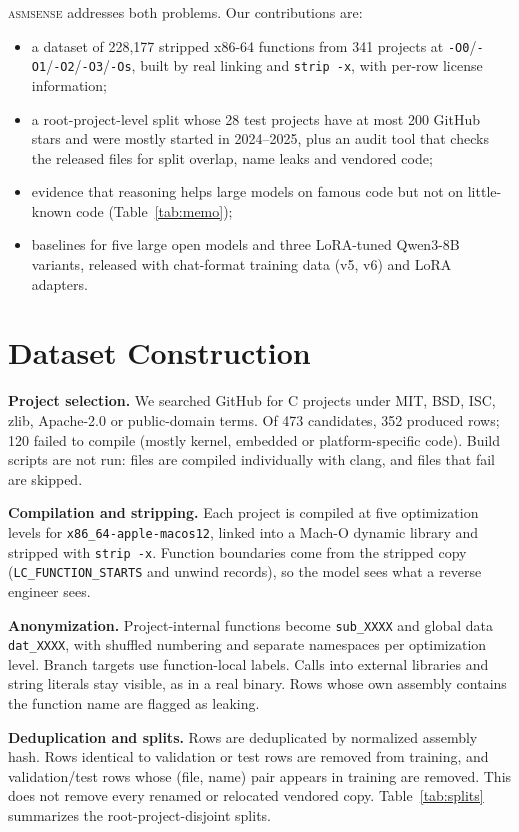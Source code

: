 \documentclass[conference]{IEEEtran}
\newcommand{\tool}{\textsc{asmsense}\xspace}
\begin{document}
\tool addresses both problems. Our contributions are:
\begin{itemize}
  \item a dataset of 228,177 stripped x86-64 functions from 341 projects at \texttt{-O0}/\texttt{-O1}/\texttt{-O2}/\texttt{-O3}/\texttt{-Os}, built by real linking and \texttt{strip -x}, with per-row license information;
  \item a root-project-level split whose 28 test projects have at most 200 GitHub stars and were mostly started in 2024--2025, plus an audit tool that checks the released files for split overlap, name leaks and vendored code;
  \item evidence that reasoning helps large models on famous code but not on little-known code (Table~\ref{tab:memo});
  \item baselines for five large open models and three LoRA-tuned Qwen3-8B variants, released with chat-format training data (v5, v6) and LoRA adapters.
\end{itemize}

\section{Dataset Construction}
\textbf{Project selection.} We searched GitHub for C projects under MIT, BSD, ISC, zlib, Apache-2.0 or public-domain terms. Of 473 candidates, 352 produced rows; 120 failed to compile (mostly kernel, embedded or platform-specific code). Build scripts are not run: files are compiled individually with clang, and files that fail are skipped.

\textbf{Compilation and stripping.} Each project is compiled at five optimization levels for \texttt{x86\_64-apple-macos12}, linked into a Mach-O dynamic library and stripped with \texttt{strip -x}. Function boundaries come from the stripped copy (\texttt{LC\_FUNCTION\_STARTS} and unwind records), so the model sees what a reverse engineer sees.

\textbf{Anonymization.} Project-internal functions become \texttt{sub\_XXXX} and global data \texttt{dat\_XXXX}, with shuffled numbering and separate namespaces per optimization level. Branch targets use function-local labels. Calls into external libraries and string literals stay visible, as in a real binary. Rows whose own assembly contains the function name are flagged as leaking.

\textbf{Deduplication and splits.} Rows are deduplicated by normalized assembly hash. Rows identical to validation or test rows are removed from training, and validation/test rows whose (file, name) pair appears in training are removed. This does not remove every renamed or relocated vendored copy. Table~\ref{tab:splits} summarizes the root-project-disjoint splits.
\end{document}
